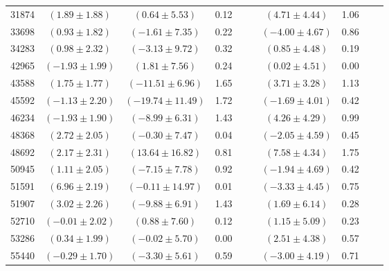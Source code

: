 \documentclass [10pt, twoside] {uwthesis}[2012/04/02]
\begin{document}
{\begin{longtable}[t]{|c|c|cccc|cccc|}
31874	&  $(	1.89	  \pm  	1.88	)$  &  $(	0.64	  \pm  	5.53	)$  &  	0.12	  &  		  &  		  &  $(	4.71	  \pm  	4.44	)$  &  	1.06	  &  		  &  		  \\
33698	&  $(	0.93	  \pm  	1.82	)$  &  $(	-1.61	  \pm  	7.35	)$  &  	0.22	  &  		  &  		  &  $(	-4.00	  \pm  	4.67	)$  &  	0.86	  &  		  &  		  \\
34283	&  $(	0.98	  \pm  	2.32	)$  &  $(	-3.13	  \pm  	9.72	)$  &  	0.32	  &  		  &  		  &  $(	0.85	  \pm  	4.48	)$  &  	0.19	  &  		  &  		  \\
42965	&  $(	-1.93	  \pm  	1.99	)$  &  $(	1.81	  \pm  	7.56	)$  &  	0.24	  &  		  &  		  &  $(	0.02	  \pm  	4.51	)$  &  	0.00	  &  		  &  		  \\
43588	&  $(	1.75	  \pm  	1.77	)$  &  $(	-11.51	  \pm  	6.96	)$  &  	1.65	  &  		  &  		  &  $(	3.71	  \pm  	3.28	)$  &  	1.13	  &  		  &  		  \\
45592	&  $(	-1.13	  \pm  	2.20	)$  &  $(	-19.74	  \pm  	11.49	)$  &  	1.72	  &  		  &  		  &  $(	-1.69	  \pm  	4.01	)$  &  	0.42	  &  		  &  		  \\
46234	&  $(	-1.93	  \pm  	1.90	)$  &  $(	-8.99	  \pm  	6.31	)$  &  	1.43	  &  		  &  		  &  $(	4.26	  \pm  	4.29	)$  &  	0.99	  &  		  &  		  \\
48368	&  $(	2.72	  \pm  	2.05	)$  &  $(	-0.30	  \pm  	7.47	)$  &  	0.04	  &  		  &  		  &  $(	-2.05	  \pm  	4.59	)$  &  	0.45	  &  		  &  		  \\
48692	&  $(	2.17	  \pm  	2.31	)$  &  $(	13.64	  \pm  	16.82	)$  &  	0.81	  &  		  &  		  &  $(	7.58	  \pm  	4.34	)$  &  	1.75	  &  		  &  		  \\
50945	&  $(	1.11	  \pm  	2.05	)$  &  $(	-7.15	  \pm  	7.78	)$  &  	0.92	  &  		  &  		  &  $(	-1.94	  \pm  	4.69	)$  &  	0.42	  &  		  &  		  \\
51591	&  $(	6.96	  \pm  	2.19	)$  &  $(	-0.11	  \pm  	14.97	)$  &  	0.01	  &  		  &  		  &  $(	-3.33	  \pm  	4.45	)$  &  	0.75	  &  		  &  		  \\
51907	&  $(	3.02	  \pm  	2.26	)$  &  $(	-9.88	  \pm  	6.91	)$  &  	1.43	  &  		  &  		  &  $(	1.69	  \pm  	6.14	)$  &  	0.28	  &  		  &  		  \\
52710	&  $(	-0.01	  \pm  	2.02	)$  &  $(	0.88	  \pm  	7.60	)$  &  	0.12	  &  		  &  		  &  $(	1.15	  \pm  	5.09	)$  &  	0.23	  &  		  &  		  \\ 
53286	&  $(	0.34	  \pm  	1.99	)$  &  $(	-0.02	  \pm  	5.70	)$  &  	0.00	  &  		  &  		  &  $(	2.51	  \pm  	4.38	)$  &  	0.57	  &  		  &  		  \\ \hline
55440	&  $(	-0.29	  \pm  	1.70	)$  &  $(	-3.30	  \pm  	5.61	)$  &  	0.59	  &  		  &  		  &  $(	-3.00	  \pm  	4.19	)$  &  	0.71	  &  		  &  		  \\

\end{longtable}}
\end{document}
